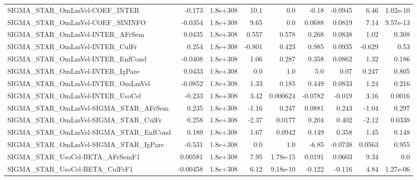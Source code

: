 \begin{tabular}{lrrrrrrrr}
SIGMA\_STAR\_OmLmVel-COEF\_INTER         &      -0.173 &     1.8e+308 &     10.1 &      0.0 &      -0.18 &     -0.0945 &         6.46 &      1.02e-10 \\
SIGMA\_STAR\_OmLmVel-COEF\_SININFO       &     -0.0354 &     1.8e+308 &     9.65 &      0.0 &     0.0688 &      0.0819 &         7.14 &      9.57e-13 \\
SIGMA\_STAR\_OmLmVel-INTER\_AFrSem       &      0.0435 &     1.8e+308 &    0.557 &    0.578 &      0.268 &      0.0838 &         1.02 &         0.308 \\
SIGMA\_STAR\_OmLmVel-INTER\_CulFr        &       0.254 &     1.8e+308 &   -0.801 &    0.423 &      0.985 &      0.0935 &       -0.629 &          0.53 \\
SIGMA\_STAR\_OmLmVel-INTER\_EnfCond      &     -0.0408 &     1.8e+308 &     1.06 &    0.287 &      0.358 &      0.0862 &         1.32 &         0.186 \\
SIGMA\_STAR\_OmLmVel-INTER\_IgPare       &      0.0433 &     1.8e+308 &      0.0 &      1.0 &        5.0 &        0.07 &        0.247 &         0.805 \\
SIGMA\_STAR\_OmLmVel-INTER\_OmLmVel      &     -0.0852 &     1.8e+308 &     1.33 &    0.185 &      0.449 &      0.0833 &         1.24 &         0.216 \\
SIGMA\_STAR\_OmLmVel-INTER\_UsoCel       &      -0.233 &     1.8e+308 &     3.42 & 0.000624 &    -0.0782 &      -0.019 &         3.16 &        0.0016 \\
SIGMA\_STAR\_OmLmVel-SIGMA\_STAR\_AFrSem  &       0.235 &     1.8e+308 &    -1.16 &    0.247 &     0.0881 &       0.243 &        -1.04 &         0.297 \\
SIGMA\_STAR\_OmLmVel-SIGMA\_STAR\_CulFr   &       0.258 &     1.8e+308 &    -2.37 &   0.0177 &      0.204 &       0.402 &        -2.12 &        0.0338 \\
SIGMA\_STAR\_OmLmVel-SIGMA\_STAR\_EnfCond &       0.189 &     1.8e+308 &     1.67 &   0.0942 &      0.149 &       0.358 &         1.45 &         0.148 \\
SIGMA\_STAR\_OmLmVel-SIGMA\_STAR\_IgPare  &      -0.531 &     1.8e+308 &      0.0 &      1.0 &      -6.85 &     -0.0738 &       0.0563 &         0.955 \\
SIGMA\_STAR\_UsoCel-BETA\_AFrSemF1       &     0.00581 &     1.8e+308 &     7.95 & 1.78e-15 &     0.0191 &      0.0603 &         9.34 &           0.0 \\
SIGMA\_STAR\_UsoCel-BETA\_CulFrF1        &    -0.00458 &     1.8e+308 &     6.12 & 9.18e-10 &     -0.122 &      -0.116 &         4.84 &      1.27e-06 \\

\end{tabular}
